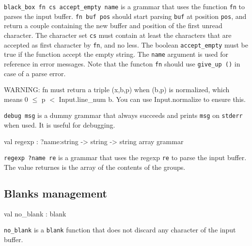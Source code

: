 \documentclass[11pt]{article}
\begin{document}
{\tt{black\_box fn cs accept\_empty name}} is a grammar that uses the
    function {\tt{fn}} to parses the input buffer. {\tt{fn buf pos}} should
    start parsing {\tt{buf}} at position {\tt{pos}}, and return a couple
    containing the new buffer and position of the first unread
    character. The character set {\tt{cs}} must contain at least the
    characters that are accepted as first character by {\tt{fn}}, and no
    less. The boolean {\tt{accept\_empty}} must be true if the function
    accept the empty string. The {\tt{name}} argument is used for reference
    in error messages. Note that the functon {\tt{fn}} should use {\tt{give\_up ()}}
    in case of a parse error.


    WARNING: fn must return a triple (x,b,p) when (b,p) is normalized,
    which means 0 $\leq$ p $<$ Input.line\_num b. You can use Input.normalize to
    ensure this.



{\tt{debug msg}} is a dummy grammar that always succeeds and prints {\tt{msg}}
    on {\tt{stderr}} when used. It is useful for debugging.



\label{val:Earley.regexp}\begin{ocamldoccode}
val regexp : ?name:string -> string -> string array grammar
\end{ocamldoccode}
\begin{ocamldocdescription}
{\tt{regexp ?name re}} is a grammar that uses the regexp {\tt{re}} to parse
    the input buffer. The value returnes is the array of the contents
    of the groups.


\end{ocamldocdescription}




\subsection{Blanks management}




\label{val:Earley.no-underscoreblank}\begin{ocamldoccode}
val no_blank : blank
\end{ocamldoccode}
\begin{ocamldocdescription}
{\tt{no\_blank}} is a {\tt{blank}} function that does not discard any character
    of the input buffer.


\end{ocamldocdescription}
\end{document}
